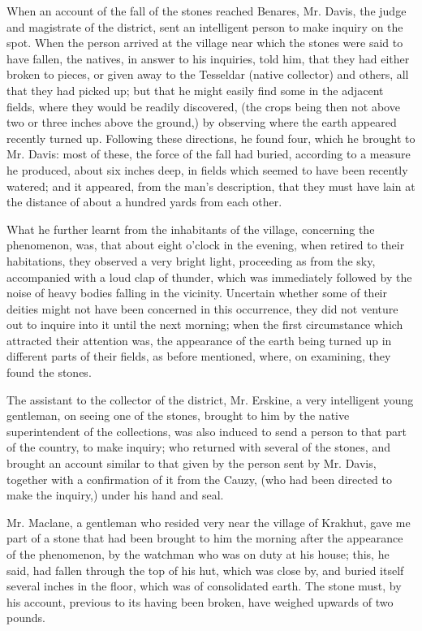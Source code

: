 \documentclass[a4paper, 12pt, oneside]{article}
\begin{document}
When an account of the fall of the stones reached Benares, Mr. Davis, the judge and magistrate of the district, sent an intelligent person to make inquiry on the spot. When the person arrived at the village near which the stones were said to have fallen, the natives, in answer to his inquiries, told him, that they had either broken to pieces, or given away to the Tesseldar (native collector) and others, all that they had picked up; but that he might easily find some in the adjacent fields, where they would be readily discovered, (the crops being then not above two or three inches above the ground,) by observing where the earth appeared recently turned up. Following these directions, he found four, which he brought to Mr. Davis: most of these, the force of the fall had buried, according to a measure he produced, about six inches deep, in fields which seemed to have been recently watered; and it appeared, from the man's description, that they must have lain at the distance of about a hundred yards from each other.

What he further learnt from the inhabitants of the village, concerning the phenomenon, was, that about eight o'clock in the evening, when retired to their habitations, they observed a very bright light, proceeding as from the sky, accompanied with a loud clap of thunder, which was immediately followed by the noise of heavy bodies falling in the vicinity. Uncertain whether some of their deities might not have been concerned in this occurrence, they did not venture out to inquire into it until the next morning; when the first circumstance which attracted their attention was, the appearance of the earth being turned up in different parts of their fields, as before mentioned, where, on examining, they found the stones.

The assistant to the collector of the district, Mr. Erskine, a very intelligent young gentleman, on seeing one of the stones, brought to him by the native superintendent of the collections, was also induced to send a person to that part of the country, to make inquiry; who returned with several of the stones, and brought an account similar to that given by the person sent by Mr. Davis, together with a confirmation of it from the Cauzy, (who had been directed to make the inquiry,) under his hand and seal.

Mr. Maclane, a gentleman who resided very near the village of Krakhut, gave me part of a stone that had been brought to him the morning after the appearance of the phenomenon, by the watchman who was on duty at his house; this, he said, had fallen through the top of his hut, which was close by, and buried itself several inches in the floor, which was of consolidated earth. The stone must, by his account, previous to its having been broken, have weighed upwards of two pounds.
\end{document}
